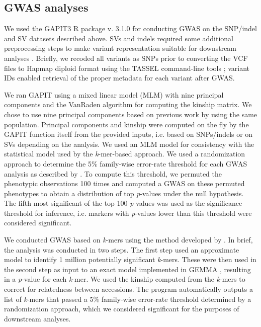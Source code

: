 \documentclass{article}
\begin{document}
\subsection*{GWAS analyses}

We used the GAPIT3 R package v. 3.1.0  for conducting GWAS on
the SNP/indel and SV datasets described above. SVs and indels required some additional
preprocessing steps to make variant
representation suitable for downstream analyses . Briefly, we recoded all
variants as SNPs prior to converting the VCF files to Hapmap diploid format
using the TASSEL command-line tools ; variant IDs enabled
retrieval of the proper metadata for each variant after GWAS.

We ran GAPIT using a mixed linear model (MLM) with nine principal components and the VanRaden
algorithm for computing the kinship matrix. We chose to use nine principal components
based on previous work by  using the same population.
Principal components and kinship were computed
on the fly by the GAPIT function itself from the provided inputs, i.e. based on SNPs/indels
or on SVs depending on the analysis. We used an MLM model for
consistency with the statistical model used by the \textit{k}-mer-based
approach.  We used a randomization approach to determine the 5\% family-wise
error-rate threshold for each GWAS analysis as described by .
To compute this threshold, we permuted the phenotypic observations 100 times
and computed a GWAS on these permuted phenotypes to obtain a distribution of
top \emph{p}-values under the null hypothesis. The fifth most significant of
the top 100 \emph{p}-values was used as the significance threshold for
inference, i.e. markers with \emph{p}-values lower than this threshold were
considered significant.

We conducted GWAS based on \emph{k}-mers using the method developed by
. In brief, the
analysis was conducted in two steps. The first step used an approximate model
to identify 1 million potentially significant \emph{k}-mers. These were then used in
the second step as input to an exact model implemented in GEMMA , resulting
in a \emph{p}-value for each \emph{k}-mer. We
used the kinship computed from the \emph{k}-mers to correct for relatedness
between accessions. The program automatically outputs a list of \emph{k}-mers
that passed a 5\% family-wise error-rate threshold determined by a
randomization approach, which we considered significant for the purposes of
downstream analyses.
\end{document}
